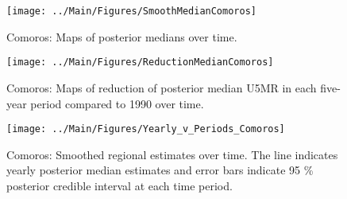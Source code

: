 \documentclass[12pt]{article}\usepackage[]{graphicx}\usepackage[]{color}
\newenvironment{knitrout}{}{} %
\begin{document}
\begin{knitrout}
\color{fgcolor}\begin{figure}[bht]

{\centering \texttt{[image: ../Main/Figures/SmoothMedianComoros]} 

}

\caption[Comoros]{Comoros: Maps of posterior medians over time.}\label{fig:unnamed-chunk-64}
\end{figure}


\end{knitrout}
\begin{knitrout}
\color{fgcolor}\begin{figure}[bht]

{\centering \texttt{[image: ../Main/Figures/ReductionMedianComoros]} 

}

\caption[Comoros]{Comoros: Maps of reduction of posterior median U5MR in each five-year period compared to 1990 over time.}\label{fig:unnamed-chunk-65}
\end{figure}


\end{knitrout}
\begin{knitrout}
\color{fgcolor}\begin{figure}[bht]

{\centering \texttt{[image: ../Main/Figures/Yearly\_v\_Periods\_Comoros]} 

}

\caption[Comoros]{Comoros: Smoothed regional estimates over time. The line indicates yearly posterior median estimates and error bars indicate 95 \% posterior credible interval at each time period.}\label{fig:unnamed-chunk-66}
\end{figure}


\end{knitrout}
\end{document}
